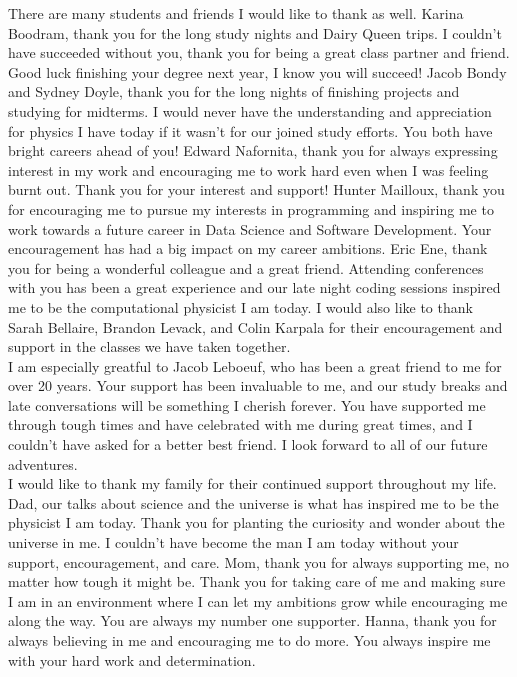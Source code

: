 \documentclass[12pt,oneside,final]{vlsithesis}
\numberwithin{equation}{chapter}
\begin{document}
{There are many students and friends I would like to thank as well. Karina Boodram, thank you for the long study nights and Dairy Queen trips. I couldn't have succeeded without you, thank you for being a great class partner and friend. Good luck finishing your degree next year, I know you will succeed! Jacob Bondy and Sydney Doyle, thank you for the long nights of finishing projects and studying for midterms. I would never have the understanding and appreciation for physics I have today if it wasn't for our joined study efforts. You both have bright careers ahead of you! Edward Nafornita, thank you for always expressing interest in my work and encouraging me to work hard even when I was feeling burnt out. Thank you for your interest and support! Hunter Mailloux, thank you for encouraging me to pursue my interests in programming and inspiring me to work towards a future career in Data Science and Software Development. Your encouragement has had a big impact on my career ambitions. Eric Ene, thank you for being a wonderful colleague and a great friend. Attending conferences with you has been a great experience and our late night coding sessions inspired me to be the computational physicist I am today. I would also like to thank Sarah Bellaire, Brandon Levack, and Colin Karpala for their encouragement and support in the classes we have taken together. \\

I am especially greatful to Jacob Leboeuf, who has been a great friend to me for over 20 years. Your support has been invaluable to me, and our study breaks and late conversations will be something I cherish forever. You have supported me through tough times and have celebrated with me during great times, and I couldn't have asked for a better best friend. I look forward to all of our future adventures.\\

I would like to thank my family for their continued support throughout my life. Dad, our talks about science and the universe is what has inspired me to be the physicist I am today. Thank you for planting the curiosity and wonder about the universe in me. I couldn't have become the man I am today without your support, encouragement, and care. Mom, thank you for always supporting me, no matter how tough it might be. Thank you for taking care of me and making sure I am in an environment where I can let my ambitions grow while encouraging me along the way. You are always my number one supporter. Hanna, thank you for always believing in me and encouraging me to do more. You always inspire me with your hard work and determination.\\

}
\end{document}
